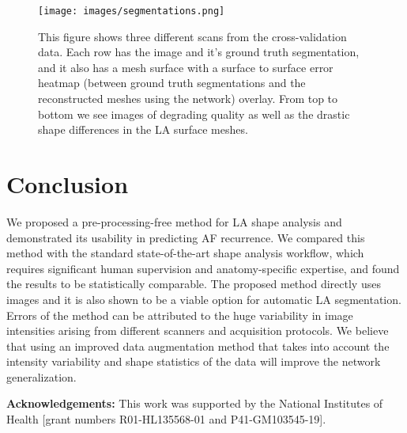 \documentclass[twocolumn]{cinc}
\begin{document}
\begin{figure}[!h]
	\centering
	\texttt{[image: images/segmentations.png]}
	\vspace{-0.1in}
	\caption{This figure shows three different scans from the cross-validation data. Each row has the image and it's ground truth segmentation, and it also has a mesh surface with a surface to surface error heatmap (between ground truth segmentations and the reconstructed meshes using the network) overlay. From top to bottom we see images of degrading quality as well as the drastic shape differences in the LA surface meshes.}
	\label{fig:hausdaurff}
	\vspace{-0.2in}
\end{figure}

\vspace{-0.1in}
\section{Conclusion}
\vspace{-0.1in}
We proposed a pre-processing-free method for LA shape analysis and demonstrated its usability in predicting AF recurrence. We compared this method with the standard state-of-the-art shape analysis workflow, which requires significant human supervision and anatomy-specific expertise, and found the results to be statistically comparable. The proposed method directly uses images and it is also shown to be a viable option for automatic LA segmentation. Errors of the method can be attributed to the huge variability in image intensities arising from different scanners and acquisition protocols. We believe that using an improved data augmentation method that takes into account the intensity variability and shape statistics of the data will improve the network generalization.

\vspace{0.03in}
\noindent\textbf{Acknowledgements: } This work was supported by the National Institutes of Health [grant numbers R01-HL135568-01 and P41-GM103545-19]. 
\vspace{-0.1in}

\vspace{-0.2in}

\end{document}
